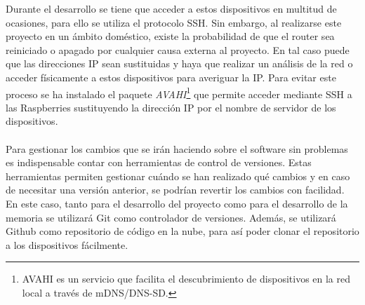 Durante el desarrollo se tiene que acceder a estos dispositivos en multitud de ocasiones, para ello se utiliza el protocolo SSH. Sin embargo, al realizarse este proyecto en un ámbito doméstico, existe la probabilidad de que el router sea reiniciado o apagado por cualquier causa externa al proyecto. En tal caso puede que las direcciones IP sean sustituidas y haya que realizar un análisis de la red o acceder físicamente a estos dispositivos para averiguar la IP. Para evitar este proceso se ha instalado el paquete \textit{AVAHI}\footnote{AVAHI es un servicio que facilita el descubrimiento de dispositivos en la red local a través de mDNS/DNS-SD.} que permite acceder mediante SSH a las Raspberries sustituyendo la dirección IP por el nombre de servidor de los dispositivos.
\\ \\
Para gestionar los cambios que se irán haciendo sobre el software sin problemas es indispensable contar con herramientas de control de versiones. Estas herramientas permiten gestionar cuándo se han realizado qué cambios y en caso de necesitar una versión anterior, se podrían revertir los cambios con facilidad. En este caso, tanto para el desarrollo del proyecto como para el desarrollo de la memoria se utilizará Git como controlador de versiones. Además, se utilizará Github como repositorio de código en la nube, para así poder clonar el repositorio a los dispositivos fácilmente.
